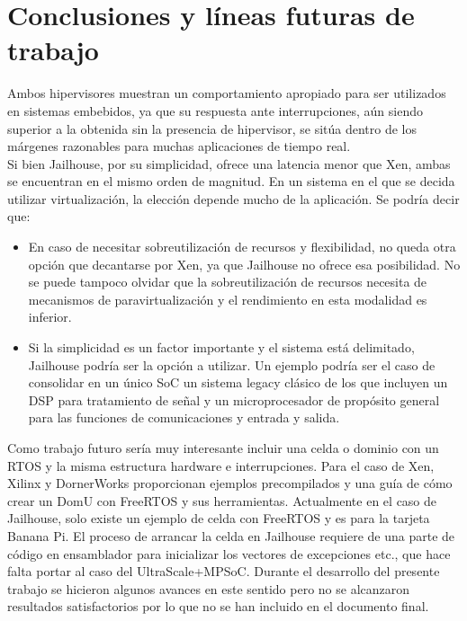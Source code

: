 \chapter{Conclusiones y líneas futuras de trabajo}

Ambos hipervisores muestran un comportamiento apropiado para ser utilizados en sistemas embebidos, ya que su respuesta ante interrupciones, aún siendo superior a la obtenida sin la presencia de hipervisor, se sitúa dentro de los márgenes razonables para muchas aplicaciones de tiempo real.\\

Si bien Jailhouse, por su simplicidad, ofrece una latencia menor que Xen, ambas se encuentran en el mismo orden de magnitud. En un sistema en el que se decida utilizar virtualización, la elección depende mucho de la aplicación. Se podría decir que:

\begin{itemize}
  \item En caso de necesitar sobreutilización de recursos y flexibilidad, no queda otra opción que decantarse por Xen, ya que Jailhouse no ofrece esa posibilidad. No se puede tampoco olvidar que la sobreutilización de recursos necesita de mecanismos de paravirtualización y el rendimiento en esta modalidad es inferior.

 \item Si la simplicidad es un factor importante y el sistema está delimitado, Jailhouse podría ser la opción a utilizar. Un ejemplo podría ser el caso de consolidar en un único \acrshort{SoC} un sistema legacy clásico de los que incluyen un \acrshort{DSP} para tratamiento de señal y un microprocesador de propósito general para las funciones de comunicaciones y entrada y salida.

\end{itemize}

Como trabajo futuro sería muy interesante incluir una celda o dominio con un \acrshort{RTOS} y la misma estructura hardware e interrupciones. Para el caso de Xen, Xilinx y DornerWorks proporcionan ejemplos precompilados y una guía de cómo crear un DomU con FreeRTOS y sus herramientas. Actualmente en el caso de Jailhouse, solo existe un ejemplo de celda con FreeRTOS y es para la tarjeta Banana Pi. El proceso de arrancar la celda en Jailhouse requiere de una parte de código en ensamblador para inicializar los vectores de excepciones etc., que hace falta portar al caso del UltraScale+\texttrademark MPSoC. Durante el desarrollo del presente trabajo se hicieron algunos avances en este sentido pero no se alcanzaron resultados satisfactorios por lo que no se han incluido en el documento final.

